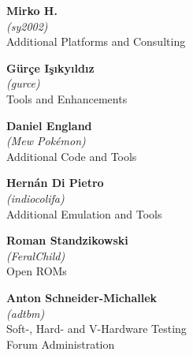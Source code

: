 \begin{mega65thanks}
\begin{minipage}{\linewidth}
    {\large\bf Mirko H.} \\
    \textit{(sy2002)} \\
    Additional Platforms and Consulting
\end{minipage}

\begin{minipage}{\linewidth}
    {\large\bf Gürçe Işıkyıldız} \\
    \textit{(gurce)} \\
    Tools and Enhancements
\end{minipage}

\begin{minipage}{\linewidth}
    {\large\bf Daniel England} \\
    \textit{(Mew Pokémon)} \\
    Additional Code and Tools
\end{minipage}

\begin{minipage}{\linewidth}
    {\large\bf Hernán Di Pietro} \\
    \textit{(indiocolifa)} \\
    Additional Emulation and Tools
\end{minipage}

\begin{minipage}{\linewidth}
    {\large\bf Roman Standzikowski} \\
    \textit{(FeralChild)} \\
    Open ROMs
\end{minipage}

\begin{minipage}{\linewidth}
    {\large\bf Anton Schneider-Michallek} \\
    \textit{(adtbm)} \\
    Soft-, Hard- and V-Hardware Testing \\
    Forum Administration
\end{minipage}

\end{mega65thanks}
